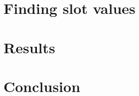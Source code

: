 \documentclass[letterpaper]{article}
\begin{document}
\section{Finding slot values}

\section{Results}

\section{Conclusion}

%



%
\end{document}
